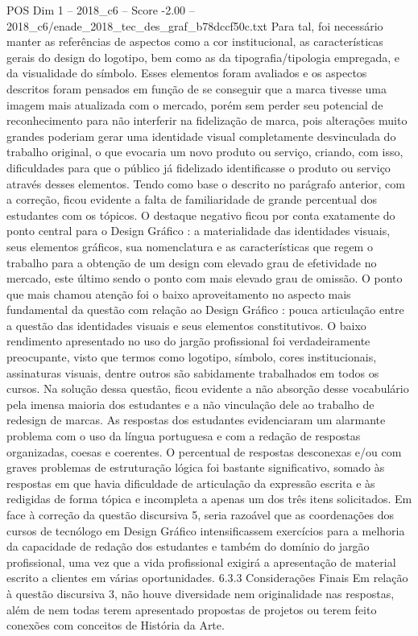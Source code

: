 \begin{textsample}{POS Dim 1 – 2018\_c6 – Score -2.00 – 2018\_c6/enade\_2018\_tec\_des\_graf\_b78dccf50c.txt}
Para tal, foi necessário manter as referências de aspectos como a cor institucional, as características gerais do design do logotipo, bem como as da tipografia/tipologia empregada, e da visualidade do símbolo.
Esses elementos foram avaliados e os aspectos descritos foram pensados em função de se conseguir que a marca tivesse uma imagem mais atualizada com o mercado, porém sem perder seu potencial de reconhecimento para não interferir na fidelização de marca, pois alterações muito grandes poderiam gerar uma identidade visual completamente desvinculada do trabalho original, o que evocaria um novo produto ou serviço, criando, com isso, dificuldades para que o público já fidelizado identificasse o produto ou serviço através desses elementos.
Tendo como base o descrito no parágrafo anterior, com a correção, ficou evidente a falta de familiaridade de grande percentual dos estudantes com os tópicos.
O destaque negativo ficou por conta exatamente do ponto central para o Design Gráfico : a materialidade das identidades visuais, seus elementos gráficos, sua nomenclatura e as características que regem o trabalho para a obtenção de um design com elevado grau de efetividade no mercado, este último sendo o ponto com mais elevado grau de omissão.
O ponto que mais chamou atenção foi o baixo aproveitamento no aspecto mais fundamental da questão com relação ao Design Gráfico : pouca articulação entre a questão das identidades visuais e seus elementos constitutivos.
O baixo rendimento apresentado no uso do jargão profissional foi verdadeiramente preocupante, visto que termos como logotipo, símbolo, cores institucionais, assinaturas visuais, dentre outros são sabidamente trabalhados em todos os cursos.
Na solução dessa questão, ficou evidente a não absorção desse vocabulário pela imensa maioria dos estudantes e a não vinculação dele ao trabalho de redesign de marcas.
As respostas dos estudantes evidenciaram um alarmante problema com o uso da língua portuguesa e com a redação de respostas organizadas, coesas e coerentes.
O percentual de respostas desconexas e/ou com graves problemas de estruturação lógica foi bastante significativo, somado às respostas em que havia dificuldade de articulação da expressão escrita e às redigidas de forma tópica e incompleta a apenas um dos três itens solicitados.
Em face à correção da questão discursiva 5, seria razoável que as coordenações dos cursos de tecnólogo em Design Gráfico intensificassem exercícios para a melhoria da capacidade de redação dos estudantes e também do domínio do jargão profissional, uma vez que a vida profissional exigirá a apresentação de material escrito a clientes em várias oportunidades. 6.3.3 Considerações Finais Em relação à questão discursiva 3, não houve diversidade nem originalidade nas respostas, além de nem todas terem apresentado propostas de projetos ou terem feito conexões com conceitos de História da Arte.

\end{textsample}
